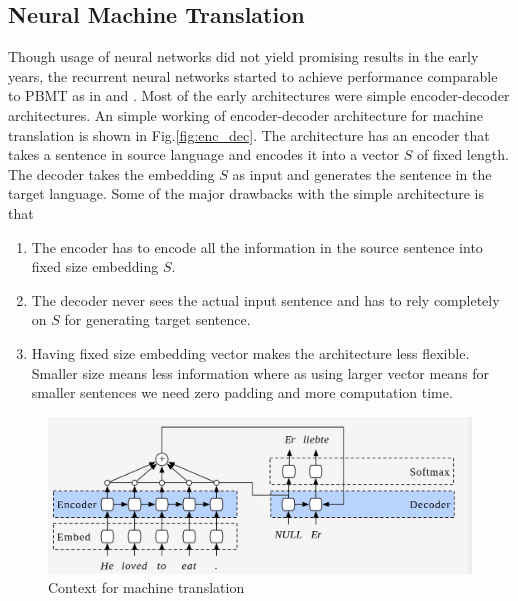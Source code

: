 \documentclass[conference]{IEEEtran}
\begin{document}
\subsection{Neural Machine Translation}
Though usage of neural networks did not yield promising results in the early years, the recurrent neural networks started to achieve performance comparable to PBMT as in \cite{kalchbrenner2013recurrent} and \cite{hermann2013multilingual}. Most of the early architectures were simple encoder-decoder architectures. An simple working of encoder-decoder architecture for machine translation is shown in Fig.\ref{fig:enc_dec}. The architecture has an encoder that takes a sentence in source language and encodes it into a vector $S$ of fixed length. The decoder takes the embedding $S$ as input and generates the sentence in the target language. Some of the major drawbacks with the simple architecture is that
\begin{enumerate}
 \item The encoder has to encode all the information in the source sentence into fixed size embedding $S$. 
 \item The decoder never sees the actual input sentence and has to rely completely on $S$ for generating target sentence. 
 \item Having fixed size embedding vector makes the architecture less flexible. Smaller size means less information where as using larger vector means for smaller sentences we need zero padding and more computation time.
\end{enumerate}


\begin{figure}
    \includegraphics[width=.99\linewidth]{img/context.png}  
    \caption{Context for machine translation} 
    \label{fig:context}
\end{figure}
\end{document}
